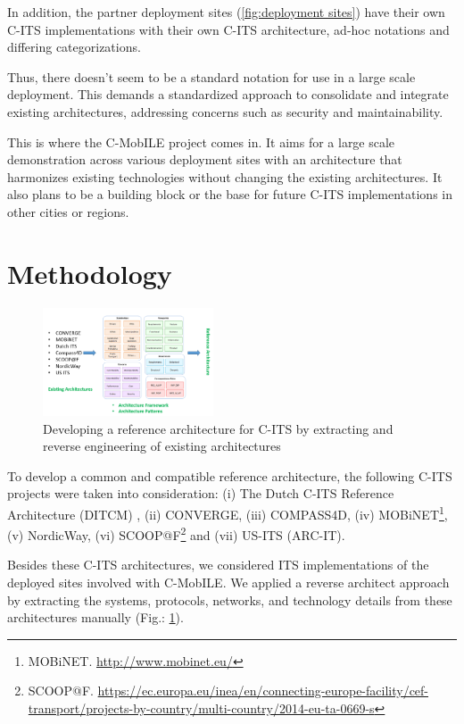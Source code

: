 \documentclass[conference]{IEEEtran}
\begin{document}
In addition, the partner deployment sites (\ref{fig:deployment sites}) have their own C-ITS implementations with their own C-ITS architecture, ad-hoc notations and differing categorizations.

Thus, there doesn't seem to be a standard notation for use in a large scale deployment. This demands a standardized approach to consolidate and integrate existing architectures, addressing concerns such as security and maintainability.

This is where the C-MobILE project comes in. It aims for a large scale demonstration across various deployment sites with an architecture that harmonizes existing technologies without changing the existing architectures. It also plans to be a building block or the base for future C-ITS implementations in other cities or regions.

\section{Methodology}
\begin{figure}[ht!]
	\centering
	\includegraphics[width=0.45\textwidth]{methodology}
	\caption{Developing a reference architecture for C-ITS by extracting and reverse engineering of existing architectures}
 	\label{methodology}
 	\centering
\end{figure}
To develop a common and compatible reference architecture, the following C-ITS projects were taken into consideration: (i) The Dutch C-ITS Reference Architecture (DITCM) \cite{ditcm}\cite{ditcmits}, (ii) CONVERGE\footnotemark[\ref{converge}], (iii) COMPASS4D\footnotemark[\ref{compass4d}], (iv) MOBiNET\footnote{\label{mobinet}MOBiNET. \url{http://www.mobinet.eu/}}, (v) NordicWay\footnotemark[\ref{nordicway}], (vi) SCOOP@F\footnote{SCOOP@F. \url{https://ec.europa.eu/inea/en/connecting-europe-facility/cef-transport/projects-by-country/multi-country/2014-eu-ta-0669-s}} and (vii) US-ITS (ARC-IT)\footnotemark[\ref{arcit}].

Besides these C-ITS architectures, we considered ITS implementations of the deployed sites involved with C-MobILE.
We applied a reverse architect approach by extracting the systems, protocols, networks, and technology details from these architectures manually (Fig.: \ref{methodology}).
\end{document}
